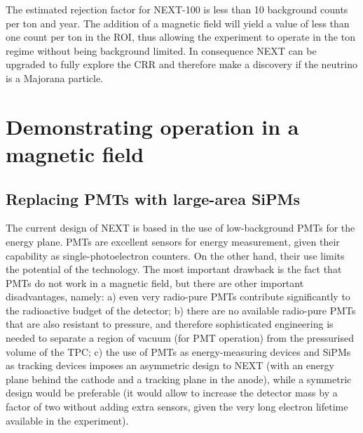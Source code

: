  The estimated rejection factor for NEXT-100 is less than 10 background counts per ton and year. The addition of a magnetic field will yield a value of less than one count per ton in the ROI, thus allowing the experiment to operate in the ton regime without being background limited. In consequence NEXT can be upgraded to fully explore the CRR and therefore make a discovery if the neutrino is a Majorana particle. 
  
\section*{Demonstrating operation in a magnetic field}

\subsection*{Replacing PMTs with large-area SiPMs}

The current design of NEXT is based in the use of low-background PMTs for the energy plane. PMTs are excellent sensors for energy measurement, given their capability as single-photoelectron counters. On the other hand, their use limits the potential of the technology. The most important drawback is the fact that PMTs do not work in a magnetic field, but there are other important disadvantages, namely: a) even very radio-pure PMTs contribute significantly to the radioactive budget of the detector; b) there are no available radio-pure PMTs that are also resistant to pressure, and therefore sophisticated engineering is needed to separate a region of vacuum (for PMT operation) from the pressurised volume of the TPC; c) the use of PMTs as energy-measuring devices and SiPMs as tracking devices imposes an asymmetric design to NEXT (with an energy plane behind the cathode and a tracking plane in the anode), while a symmetric design would be preferable (it would allow to increase the detector mass by a factor of two without adding extra sensors, given the very long electron lifetime available in the experiment). 

